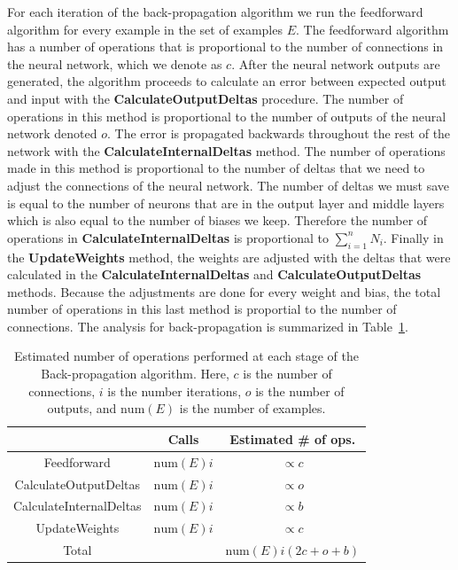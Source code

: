 \documentclass[11pt]{article}
\begin{document}
For each iteration of the back-propagation algorithm we run the feedforward algorithm for every example in the set of examples $E$. The
feedforward algorithm has a number of operations that is proportional to the number of connections in the neural network, which we
denote as $c$. After the neural network outputs are generated, the algorithm proceeds to calculate an error between expected output and
input with the \textbf{CalculateOutputDeltas} procedure. The number of operations in this method is proportional to the number of
outputs of the neural network denoted $o$. The error is propagated backwards throughout the rest of the network with the
\textbf{CalculateInternalDeltas} method. The number of operations made in this method is proportional to the number of deltas that we
need to adjust the connections of the neural network. The number of deltas we must save is equal to the number of neurons that are in
the output layer and middle layers which is also equal to the number of biases we keep. Therefore the number of operations in
\textbf{CalculateInternalDeltas} is proportional to $\sum_{i=1}^{n}N_{i}$. Finally in the \textbf{UpdateWeights} method, the weights are
adjusted with the deltas that were calculated in the \textbf{CalculateInternalDeltas} and \textbf{CalculateOutputDeltas} methods.
Because the adjustments are done for every weight and bias, the total number of operations in this last method is proportial to the
number of connections. The analysis for back-propagation is summarized in Table~\ref{tab:backpropagation}.

\begin{table} 
	\label{tab:backpropagation}
	\begin{center}
		\begin{tabular}{ccc}
		\hline
		& Calls & Estimated \# of ops.\\
		\hline
		Feedforward & $\mbox{num}(E)i$ & $\propto c$\\
		CalculateOutputDeltas & $\mbox{num}(E)i$ & $\propto o$\\
		CalculateInternalDeltas & $\mbox{num}(E)i$ & $\propto b$\\
		UpdateWeights & $\mbox{num}(E)i$ & $\propto c$\\
		\hline
		Total & & $\mbox{num}(E)i(2c+o+b)$\\
		\hline
		\end{tabular}
		\caption{Estimated number of operations performed at each stage of the Back-propagation algorithm. Here, $c$ is the number of connections, $i$ is the number iterations, $o$ is the number of outputs, and $\mbox{num}(E)$ is the number of examples.}
	\end{center}
\end{table}
\end{document}
